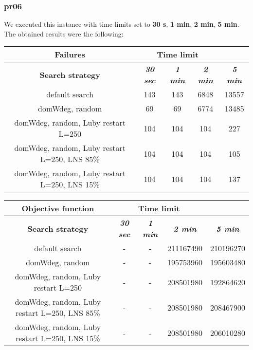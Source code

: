 \subsubsection{pr06}
We executed this instance with time limits set to \textbf{30 s}, \textbf{1 min}, \textbf{2 min}, \textbf{5 min}.\\
The obtained results were the following:
{
\renewcommand{\arraystretch}{2}
\begin{longtable}[h]{| c | c | c | c | c |}
    \hline
    \textbf{Failures} & \multicolumn{3}{c}{Time limit} & \\
    \hline
    \textbf{Search strategy} & \textbf{\textit{30 sec}} & \textbf{\textit{1 min}} & \textbf{\textit{2 min}} & \textbf{\textit{5 min}} \\
    \hline
    \endhead
    default search                                & 143 &  143 &  6848 & 13557 \\
    \hline
    domWdeg, random                               &  69 &   69 &  6774 & 13485 \\
    \hline
    domWdeg, random, Luby restart L=250           & 104 &  104 &  104 &    227 \\
    \hline
    domWdeg, random, Luby restart L=250, LNS 85\% & 104 &  104 &  104 &    105 \\
    \hline
    domWdeg, random, Luby restart L=250, LNS 15\% & 104 &  104 &  104 &    137 \\
    \hline
\end{longtable}
}

{
\renewcommand{\arraystretch}{2}
\begin{longtable}[h]{| c | c | c | c | c |}
    \hline
    \textbf{Objective function} & \multicolumn{3}{c}{Time limit} & \\
    \hline
    \textbf{Search strategy} & \textbf{\textit{30 sec}} & \textbf{\textit{1 min}} & \textbf{\textit{2 min}} & \textbf{\textit{5 min}} \\
    \hline
    \endhead
    default search                                & - & - & 211167490 & 210196270 \\
    \hline
    domWdeg, random                               & - & - & 195753960 & 195603480 \\
    \hline
    domWdeg, random, Luby restart L=250           & - & - & 208501980 & 192864620 \\
    \hline
    domWdeg, random, Luby restart L=250, LNS 85\% & - & - & 208501980 & 208467900 \\
    \hline
    domWdeg, random, Luby restart L=250, LNS 15\% & - & - & 208501980 & 206010280 \\
    \hline
\end{longtable}
}